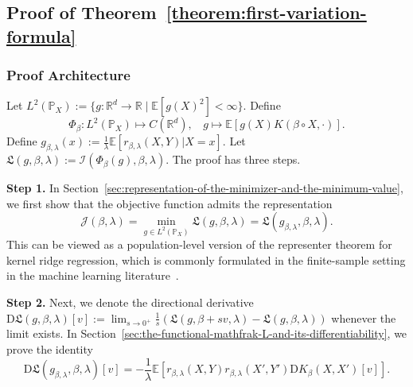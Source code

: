 \documentclass[sn-mathphys-num]{sn-jnl}%
\numberwithin{equation}{section}
\newcommand{\redblock}[1]{{\color{black}#1}}
\newcommand{\R}{\mathbb{R}}
\newcommand{\E}{\mathbb{E}}
\newcommand{\kernel}{K}
\renewcommand{\P}{\mathbb{P}}
\theoremstyle{thmstyleone}%
\theoremstyle{thmstyletwo}%
\theoremstyle{thmstylethree}%
\begin{document}
\subsection{Proof of Theorem~\ref{theorem:first-variation-formula}}
\label{sec:proof-of-theorem-first-variation-formula}
\redblock{\subsubsection{Proof Architecture} 
\label{sec:proof-architecture}
Let $L^2(\P_X):= \{g: \R^d \to \R \mid \E[g(X)^2] < \infty\}$. Define
\begin{equation*}
	\Phi_\beta: L^2(\P_X) \mapsto C(\R^d),~~~~ g \mapsto \E[g(X) \kernel(\beta \circ X, \cdot)].
\end{equation*}
Define $g_{\beta, \lambda}(x) := \frac{1}{\lambda} \E[r_{\beta, \lambda}(X, Y) |X = x]$. Let 
$\mathfrak{L}(g, \beta, \lambda) := \mathcal{I}(\Phi_\beta(g), \beta, \lambda)$.  The proof has three steps. 

\vspace{.8em}
\noindent\noindent
\textbf{Step 1.}
In Section~\ref{sec:representation-of-the-minimizer-and-the-minimum-value}, we 
first show that the objective function admits the representation
\begin{equation}
\label{eqn:representer-theorem-population-level}
\mathcal{J}(\beta,\lambda)
= \min_{g \in L^2(\P_X)} \mathfrak{L}(g, \beta, \lambda)
= \mathfrak{L}(g_{\beta, \lambda}, \beta, \lambda).
\end{equation} 
This can be viewed as a population-level version of the representer theorem for kernel ridge regression, which is commonly formulated in the finite-sample setting in the machine learning literature~\cite{Bach24}.

\vspace{.8em}
\noindent\noindent
\textbf{Step 2.}
Next, we denote the directional derivative
$\mathrm{D} \mathfrak{L}(g, \beta, \lambda)[v] := \lim_{s \to 0^+} \frac{1}{s}
	(\mathfrak{L}(g, \beta + s v, \lambda) - \mathfrak{L}(g, \beta, \lambda))$ whenever the limit exists. 
In Section~\ref{sec:the-functional-mathfrak-L-and-its-differentiability}, we prove the identity 
\begin{equation}	
\label{eqn:direction-derivative-explicit-formula}
	\mathrm{D} \mathfrak{L}(g_{\beta, \lambda}, \beta, \lambda)[v] = 
		- \frac{1}{\lambda} \E[r_{\beta, \lambda}(X, Y) r_{\beta, \lambda}(X', Y') \mathrm{D} \kernel_\beta(X, X')[v]]. 
\end{equation}


}
\end{document}
